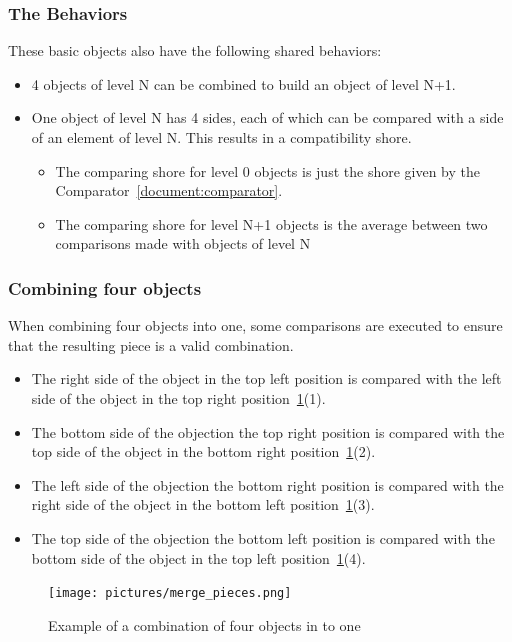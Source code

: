 \documentclass{article}
\begin{document}
\subsubsection{The Behaviors}

These basic objects also have the following shared behaviors:
\begin{itemize}
  \item 4 objects of level N can be combined to build an object of level N+1.
  \item One object of level N has 4 sides, each of which can be compared with a side of an element of level N. This results in a compatibility shore.
  \begin{itemize}
    \item The comparing shore for level 0 objects is just the shore given by the Comparator~\cref{document:comparator}.
    \item The comparing shore for level N+1 objects is the average between two comparisons made with objects of level N
  \end{itemize}
\end{itemize}

\subsubsection{Combining four objects}\label{document:combining_four_objects}
When combining four objects into one, some comparisons are executed to
ensure that the resulting piece is a valid  combination.

\begin{itemize}
  \item The right side of the object in the top left position is compared with the left side of the object in the top right position~\cref{fig:merge_pieces}(1).
  \item The bottom side of the objection the top right position is compared with the top side of the object in the bottom right position~\cref{fig:merge_pieces}(2).
  \item The left side of the objection the bottom right position is compared with the right side of the object in the bottom left position~\cref{fig:merge_pieces}(3).
  \item The top side of the objection the bottom left position is compared with the bottom side of the object in the top left position~\cref{fig:merge_pieces}(4).
\end{itemize}

\begin{figure}[H]
  \caption{Example of a combination of four objects in to one}\label{fig:merge_pieces}
  \centering
  \texttt{[image: pictures/merge\_pieces.png]}
\end{figure}
\end{document}
